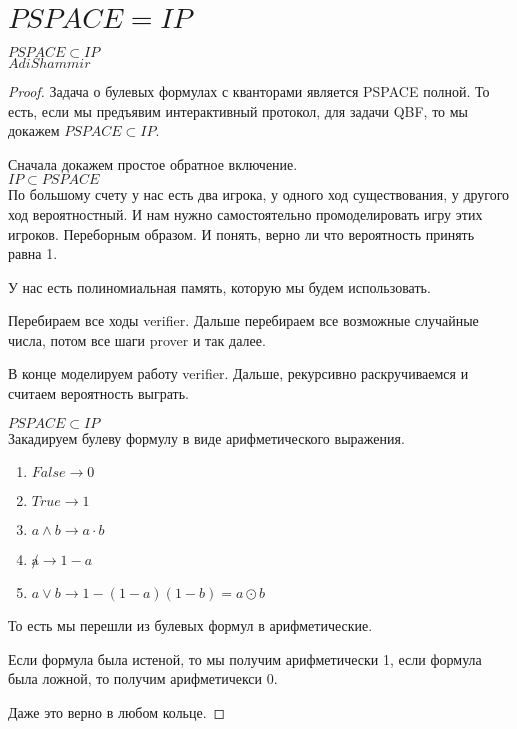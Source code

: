 \section{$PSPACE = IP$}
\begin{theorem}
$PSPACE \subset IP$\\
$Adi Shammir$ 
\end{theorem}
\begin{proof}
Задача о булевых формулах с кванторами является PSPACE полной. 
То есть, если мы предъявим интерактивный протокол, для задачи 
QBF, то мы докажем $PSPACE \subset IP$.

Сначала докажем простое обратное включение.\\ 
$IP \subset PSPACE$\\

По большому счету у нас есть два игрока, у 
одного ход существования, у другого ход вероятностный. 
И нам нужно самостоятельно промоделировать игру этих игроков. 
Переборным образом. И понять, верно ли что вероятность принять
равна 1.

У нас есть полиномиальная память, которую мы будем использовать. 

Перебираем все ходы verifier. Дальше перебираем все возможные случайные 
числа, потом все шаги prover и так далее.

В конце моделируем работу verifier. Дальше, рекурсивно 
раскручиваемся и считаем вероятность выграть. 

$PSPACE \subset IP$\\

Закадируем булеву формулу в виде арифметического выражения.
\begin{enumerate}
\item $False \to 0$\\
\item $True \to 1$\\
\item $a \wedge b \to a\cdot b$\\
\item $\not a \to 1 - a$\\
\item $a \vee b \to 1 - (1 - a)(1 - b) = a \odot b $\\
\end{enumerate}
То есть мы перешли из булевых формул в арифметические. 

Если формула была истеной, то мы получим арифметически 1, 
если формула была ложной, то получим арифметичекси 0. 

Даже это верно в любом кольце. 


\end{proof}
